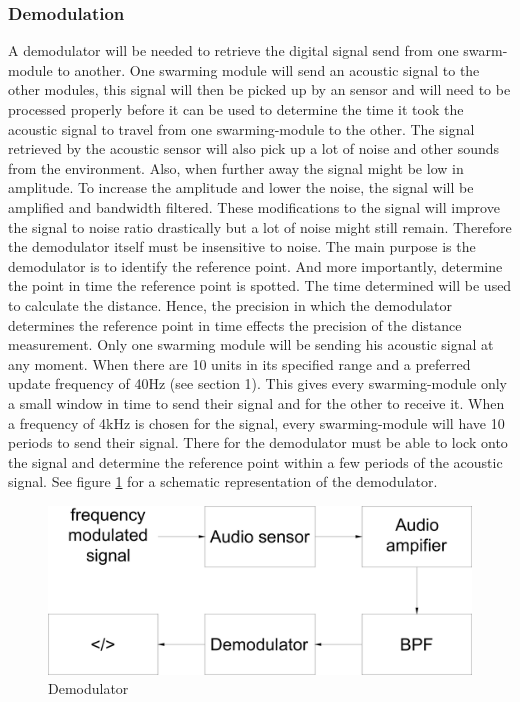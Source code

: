 \documentclass[10pt,a4paper]{article}
\begin{document}
\subsubsection{Demodulation}

A demodulator will be needed to retrieve the digital signal send from one swarm-module to another.  One swarming module will send an acoustic signal to the other modules, this signal will then be picked up by an sensor and will need to be processed properly before it can be used to determine the time it took the acoustic signal to travel from one swarming-module to the other. The signal retrieved by the acoustic sensor will also pick up a lot of noise and other sounds from the environment. Also, when further away the signal might be low in amplitude. To increase the amplitude and lower the noise, the signal will be amplified and bandwidth filtered. These modifications to the signal will improve the signal to noise ratio drastically but a lot of noise might still remain. Therefore the demodulator itself must be insensitive to noise.  
The main purpose is the demodulator is to identify the reference point. And more importantly, determine the point in time the reference point is spotted. The time determined will be used to calculate the distance. Hence, the precision in which the demodulator determines the reference point in time effects the precision of the distance measurement. Only one swarming module will be sending his acoustic signal at any moment. When there are 10 units in its specified range and a preferred update frequency of 40Hz (see section 1). This gives every swarming-module only a small window in time to send their signal and for the other to receive it. When a frequency of 4kHz is chosen for the signal, every swarming-module will have 10 periods to send their signal. There for the demodulator must be able to lock onto the signal and determine the reference point within a few periods of the acoustic signal. See figure \ref{demodulator} for a schematic representation of the demodulator.

\begin{figure}[H]
  \centering
      \includegraphics[width=1\textwidth]{demodulator.pdf}
  \caption{Demodulator}
  \label{demodulator}
\end{figure}
\end{document}
